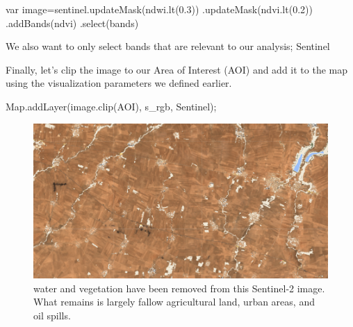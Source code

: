 \documentclass[
  letterpaper,
  DIV=11,
  numbers=noendperiod]{scrreprt}
\newenvironment{Shaded}{\begin{snugshade}}{\end{snugshade}}
\newcommand{\BuiltInTok}[1]{\textcolor[rgb]{0.00,0.23,0.31}{#1}}
\newcommand{\FloatTok}[1]{\textcolor[rgb]{0.68,0.00,0.00}{#1}}
\newcommand{\FunctionTok}[1]{\textcolor[rgb]{0.28,0.35,0.67}{#1}}
\newcommand{\KeywordTok}[1]{\textcolor[rgb]{0.00,0.23,0.31}{#1}}
\newcommand{\NormalTok}[1]{\textcolor[rgb]{0.00,0.23,0.31}{#1}}
\newcommand{\OperatorTok}[1]{\textcolor[rgb]{0.37,0.37,0.37}{#1}}
\newcommand{\StringTok}[1]{\textcolor[rgb]{0.13,0.47,0.30}{#1}}
\begin{document}
\begin{Shaded}
\begin{Highlighting}[]

\KeywordTok{var}\NormalTok{ image}\OperatorTok{=}\NormalTok{sentinel}\OperatorTok{.}\FunctionTok{updateMask}\NormalTok{(ndwi}\OperatorTok{.}\FunctionTok{lt}\NormalTok{(}\FloatTok{0.3}\NormalTok{))}
                  \OperatorTok{.}\FunctionTok{updateMask}\NormalTok{(ndvi}\OperatorTok{.}\FunctionTok{lt}\NormalTok{(}\FloatTok{0.2}\NormalTok{))}
                  \OperatorTok{.}\FunctionTok{addBands}\NormalTok{(ndvi)}
                  \OperatorTok{.}\FunctionTok{select}\NormalTok{(bands)}
\end{Highlighting}
\end{Shaded}

We also want to only select bands that are relevant to our analysis;
Sentinel

Finally, let's clip the image to our Area of Interest (AOI) and add it
to the map using the visualization parameters we defined earlier.

\begin{Shaded}
\begin{Highlighting}[]
\BuiltInTok{Map}\OperatorTok{.}\FunctionTok{addLayer}\NormalTok{(image}\OperatorTok{.}\FunctionTok{clip}\NormalTok{(AOI)}\OperatorTok{,}\NormalTok{ s\_rgb}\OperatorTok{,} \StringTok{\textquotesingle{}Sentinel\textquotesingle{}}\NormalTok{)}\OperatorTok{;}
\end{Highlighting}
\end{Shaded}

\begin{figure}

{\centering \includegraphics{./images/rojava_preprocessed.png}

}

\caption{water and vegetation have been removed from this Sentinel-2
image. What remains is largely fallow agricultural land, urban areas,
and oil spills.}

\end{figure}
\end{document}
